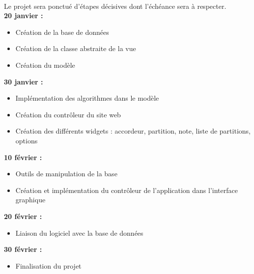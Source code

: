 \paragraph{}
	Le projet sera ponctué d'étapes décisives dont l'échéance sera à respecter. \\
		\textbf{20 janvier :}
		\begin{itemize}
			\item Création de la base de données 
			\item Création de la classe abstraite de la vue 
		  \item Création du modèle 
		\end{itemize}
		
		\textbf{30 janvier :}
		\begin{itemize}
			\item Implémentation des algorithmes dans le modèle
			\item Création du contrôleur du site web
			\item Création des différents widgets : accordeur, partition, note, liste de partitions, options
		\end{itemize}
		
		\textbf{10 février :}
		\begin{itemize}
			\item Outils de manipulation de la base
			\item Création et implémentation du contrôleur de l'application dans l'interface graphique
		\end{itemize}
		
		\textbf{20 février :}
		\begin{itemize}
			\item Liaison du logiciel avec la base de données
		\end{itemize}
		
		\textbf{30 février :}
		\begin{itemize}
			\item Finalisation du projet
		\end{itemize}
